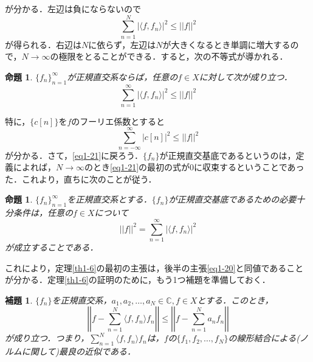 \documentclass[a4j]{jsbook}
\newtheorem{prop}[theorem]{命題}
\newtheorem{lemma}[theorem]{補題}
\numberwithin{theorem}{chapter}  %
\begin{document}
が分かる．左辺は負にならないので
\begin{equation*}
    \sum_{n=1}^N |\langle f, f_n\rangle|^2\leq ||f||^2
\end{equation*}
が得られる．右辺は\(N\)に依らず，左辺は\(N\)が大きくなるとき単調に増大するので，\(N\to\infty\)の極限をとることができる．すると，次の不等式が導かれる．
\begin{prop}
\label{prop1-7}
\(\{f_n\}_{n=1}^\infty\)が正規直交系ならば，任意の\(f\in X\)に対して次が成り立つ．
\begin{equation}
    \sum_{n=1}^\infty |\langle f, f_n\rangle|^2\leq ||f||^2 \label{eq1-22}
\end{equation}
\end{prop}
特に，\(\{c[n]\}\)を\(f\)のフーリエ係数とすると
\begin{equation*}
    \sum_{n=-\infty}^\infty |c[n]|^2\leq ||f||^2
\end{equation*}
が分かる．さて，\eqref{eq1-21}に戻ろう．\(\{f_n\}\)が正規直交基底であるというのは，定義によれば，\(N\to\infty\)のとき\eqref{eq1-21}の最初の式が0に収束するということであった．これより，直ちに次のことが従う．
\begin{prop}
\label{prop1-8}
\(\{f_n\}_{n=1}^\infty\)を正規直交系とする．\(\{f_n\}\)が正規直交基底であるための必要十分条件は，任意の\(f\in X\)について
\begin{equation*}
    ||f||^2=\sum_{n=1}^\infty |\langle f, f_n\rangle|^2
\end{equation*}
が成立することである．
\end{prop}
これにより，定理\ref{th1-6}の最初の主張は，後半の主張\eqref{eq1-20}と同値であることが分かる．定理\ref{th1-6}の証明のために，もう1つ補題を準備しておく．
\begin{lemma}
\label{lem1-9}
\(\{f_n\}\)を正規直交系，\(a_1, a_2, \dots, a_N\in\mathbb{C}, f\in X\)とする．このとき，
\begin{equation}
    \left|\left|f-\sum_{n=1}^N\langle f, f_n\rangle f_n\right|\right|\leq\left|\left|f-\sum_{n=1}^N a_nf_n\right|\right| \label{eq1-23}
\end{equation}
が成り立つ．つまり，\(\displaystyle \sum_{n=1}^N\langle f, f_n\rangle f_n\)は，\(f\)の\(\{f_1, f_2, \dots, f_N\}\)の線形結合による(ノルムに関して)最良の近似である．
\end{lemma}
\end{document}
